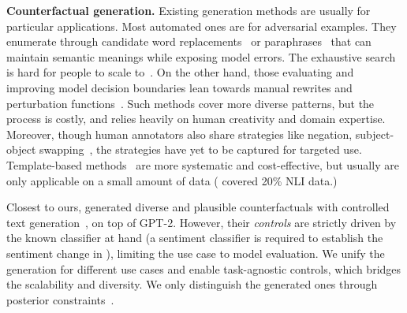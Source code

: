 \noindent\textbf{Counterfactual generation.}
Existing generation methods are usually for particular applications.
Most automated ones are for adversarial examples. 
They enumerate through candidate word replacements~\cite{alzantot2018generating, garg2020bae, alzantot2018generating, andreas2019good} or paraphrases~\cite{iyyer2018adversarial, malandrakis-etal-2019-controlled} that can maintain semantic meanings while exposing model errors.
The exhaustive search is hard for people to scale to~\cite{ribeiro2018sear}.
On the other hand, those evaluating and improving model decision boundaries lean towards manual rewrites and perturbation functions~\cite{checklist:acl20}.
Such methods cover more diverse patterns, but the process is costly, and relies heavily on human creativity and domain expertise.
Moreover, though human annotators also share strategies like negation, subject-object swapping~\cite{kaushik2019learning, gardner2020contrast}, the strategies have yet to be captured for targeted use.
Template-based methods~\cite{mccoy2019right, nie2019analyzing} are more systematic and cost-effective, but usually are only applicable on a small amount of data (\eg \citet{li2020linguistically} covered 20\% NLI data.)

Closest to ours, \citet{madaan2020generate} generated diverse and plausible counterfactuals with controlled text generation~\cite{Dathathri2020Plug}, on top of GPT-2.
However, their \emph{controls} are strictly driven by the known classifier at hand (\eg a sentiment classifier is required to establish the sentiment change in \relation{\xp}), limiting the use case to model evaluation.
We unify the generation for different use cases and enable task-agnostic controls, which bridges the scalability and diversity.
We only distinguish the generated ones through posterior constraints~\cite{morris2020textattack, alzantot-etal-2018-generating}.







